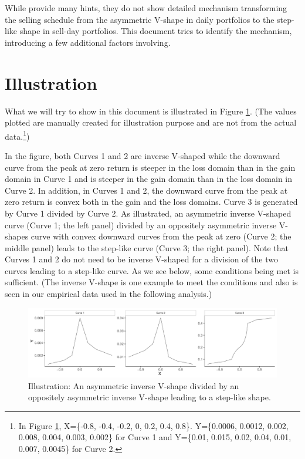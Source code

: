 \documentclass[11pt, a4paper]{article}
\begin{document}
While \citet{BenDavidHirshleifer12} provide many hints, they do not show detailed mechanism transforming the selling schedule from the asymmetric V-shape in daily portfolios to the step-like shape in sell-day portfolios. This document tries to identify the mechanism, introducing a few additional factors involving.      

\section{Illustration}
What we will try to show in this document is illustrated in Figure \ref{figure:illustration}. (The values plotted are manually created for illustration purpose and are not from the actual data.\footnote{In Figure \ref{figure:illustration}, X=\{-0.8, -0.4, -0.2, 0, 0.2, 0.4, 0.8\}. Y=\{0.0006, 0.0012, 0.002, 0.008, 0.004, 0.003, 0.002\} for Curve 1 and Y=\{0.01, 0.015, 0.02, 0.04, 0.01, 0.007, 0.0045\} for Curve 2.}) 

In the figure, both Curves 1 and 2 are inverse V-shaped while the downward curve from the peak at zero return is steeper in the loss domain than in the gain domain in Curve 1 and is steeper in the gain domain than in the loss domain in Curve 2. In addition, in Curves 1 and 2, the downward curve from the peak at zero return is convex both in the gain and the loss domains. Curve 3 is generated by Curve 1 divided by Curve 2. As illustrated, an asymmetric inverse V-shaped curve (Curve 1; the left panel) divided by an oppositely asymmetric inverse V-shapes curve with convex downward curves from the peak at zero (Curve 2; the middle panel) leads to the step-like curve (Curve 3; the right panel). Note that Curves 1 and 2 do not need to be inverse V-shaped for a division of the two curves leading to a step-like curve. As we see below, some conditions being met is sufficient. (The inverse V-shape is one example to meet the conditions and also is seen in our empirical data used in the following analysis.)


\begin{figure}[H]
	\centering
	\includegraphics[width=1.1\columnwidth]{illustration.pdf}
	\caption{\small Illustration: An asymmetric inverse  V-shape divided by an oppositely asymmetric inverse V-shape leading to a step-like shape.}
	\label{figure:illustration}
\end{figure}
\end{document}

